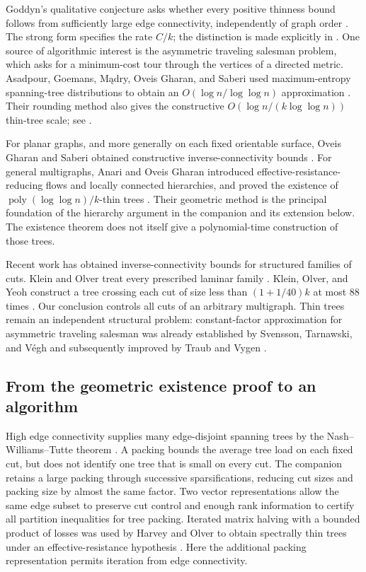 Goddyn's qualitative conjecture asks whether every positive thinness
bound follows from sufficiently large edge connectivity, independently
of graph order \cite[Problem~4]{Goddyn2004}. The strong form specifies
the rate $C/k$; the distinction is made explicitly in
\cite[Conjecture~1.3 and the following discussion]{AnariOveisGharan2015}.
One source of algorithmic interest is the asymmetric traveling salesman
problem, which asks for a minimum-cost tour through the vertices of a
directed metric. Asadpour, Goemans, M\k{a}dry, Oveis Gharan, and Saberi
used maximum-entropy spanning-tree distributions to obtain an
$O(\log n/\log\log n)$ approximation
\cite{AsadpourEtAl2017}. Their rounding method also gives the
constructive $O(\log n/(k\log\log n))$ thin-tree scale; see
\cite[Section~1]{AnariOveisGharan2015}.

For planar graphs, and more generally on each fixed orientable
surface, Oveis Gharan and Saberi obtained constructive inverse-connectivity
bounds \cite[Theorem~5.1]{OveisGharanSaberi2011}.
For general multigraphs, Anari and Oveis Gharan introduced
effective-resistance-reducing flows and locally connected hierarchies,
and proved the existence of
$\operatorname{poly}(\log\log n)/k$-thin trees
\cite[Corollary~1.8]{AnariOveisGharan2015}. Their geometric method is
the principal foundation of the hierarchy argument in the companion
and its extension below. The existence theorem does not itself give
a polynomial-time construction of those trees.

Recent work has obtained inverse-connectivity bounds for structured
families of cuts. Klein and Olver treat every prescribed laminar
family \cite{KleinOlver2023}. Klein, Olver, and Yeoh construct a tree
crossing each cut of size less than $(1+1/40)k$ at most $88$ times
\cite[Theorem~1]{KleinOlverYeoh2026}. Our conclusion controls all cuts
of an arbitrary multigraph. Thin trees remain an independent
structural problem: constant-factor approximation for asymmetric
traveling salesman was already established by Svensson, Tarnawski,
and V\'egh and subsequently improved by Traub and Vygen
\cite{SvenssonTarnawskiVegh2020,TraubVygen2022}.

\subsection{From the geometric existence proof to an algorithm}

High edge connectivity supplies many edge-disjoint spanning trees
by the Nash--Williams--Tutte theorem
\cite{NashWilliams1961,Tutte1961}. A packing bounds the average
tree load on each fixed cut, but does not identify one tree that is
small on every cut. The companion retains a large packing through
successive sparsifications, reducing cut sizes and packing size by
almost the same factor. Two vector representations allow the same
edge subset to preserve cut control and enough rank information to
certify all partition inequalities for tree packing. Iterated matrix
halving with a bounded product of losses was used by Harvey and Olver
to obtain spectrally thin trees under an effective-resistance hypothesis
\cite[full version, Appendix~F]{HarveyOlver2014}. Here the additional
packing representation permits iteration from edge connectivity.


